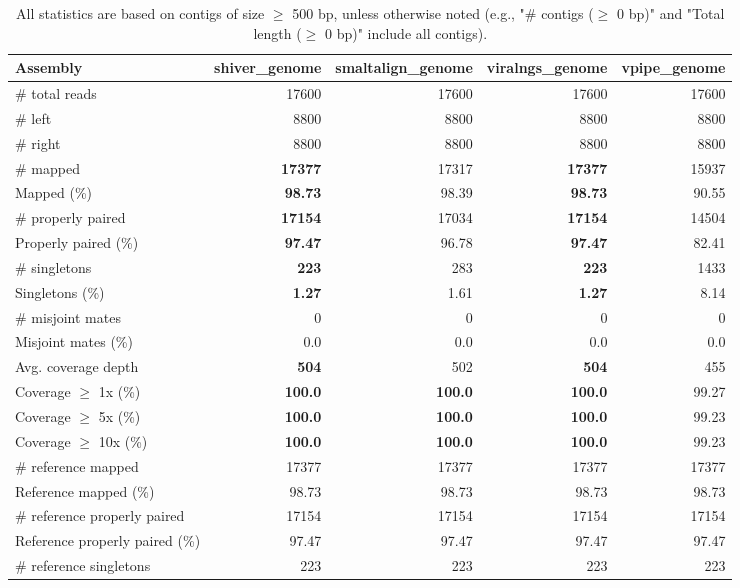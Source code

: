 \documentclass[12pt,a4paper]{article}
\begin{document}
\begin{table}[ht]
\begin{center}
\caption{All statistics are based on contigs of size $\geq$ 500 bp, unless otherwise noted (e.g., "\# contigs ($\geq$ 0 bp)" and "Total length ($\geq$ 0 bp)" include all contigs).}
\begin{tabular}{|l*{4}{|r}|}
\hline
Assembly & shiver\_genome & smaltalign\_genome & viralngs\_genome & vpipe\_genome \\ \hline
\# total reads & 17600 & 17600 & 17600 & 17600 \\ \hline
\# left & 8800 & 8800 & 8800 & 8800 \\ \hline
\# right & 8800 & 8800 & 8800 & 8800 \\ \hline
\# mapped & {\bf 17377} & 17317 & {\bf 17377} & 15937 \\ \hline
Mapped (\%) & {\bf 98.73} & 98.39 & {\bf 98.73} & 90.55 \\ \hline
\# properly paired & {\bf 17154} & 17034 & {\bf 17154} & 14504 \\ \hline
Properly paired (\%) & {\bf 97.47} & 96.78 & {\bf 97.47} & 82.41 \\ \hline
\# singletons & {\bf 223} & 283 & {\bf 223} & 1433 \\ \hline
Singletons (\%) & {\bf 1.27} & 1.61 & {\bf 1.27} & 8.14 \\ \hline
\# misjoint mates & 0 & 0 & 0 & 0 \\ \hline
Misjoint mates (\%) & 0.0 & 0.0 & 0.0 & 0.0 \\ \hline
Avg. coverage depth & {\bf 504} & 502 & {\bf 504} & 455 \\ \hline
Coverage $\geq$ 1x (\%) & {\bf 100.0} & {\bf 100.0} & {\bf 100.0} & 99.27 \\ \hline
Coverage $\geq$ 5x (\%) & {\bf 100.0} & {\bf 100.0} & {\bf 100.0} & 99.23 \\ \hline
Coverage $\geq$ 10x (\%) & {\bf 100.0} & {\bf 100.0} & {\bf 100.0} & 99.23 \\ \hline
\# reference mapped & 17377 & 17377 & 17377 & 17377 \\ \hline
Reference mapped (\%) & 98.73 & 98.73 & 98.73 & 98.73 \\ \hline
\# reference properly paired & 17154 & 17154 & 17154 & 17154 \\ \hline
Reference properly paired (\%) & 97.47 & 97.47 & 97.47 & 97.47 \\ \hline
\# reference singletons & 223 & 223 & 223 & 223 \\ \hline

\end{tabular}
\end{center}
\end{table}
\end{document}
